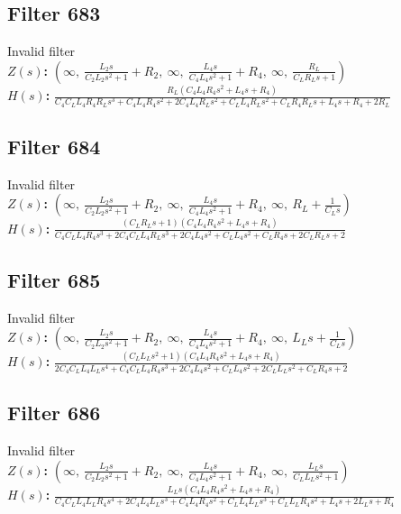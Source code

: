 \documentclass{article}
\begin{document}
\subsection*{Filter 683}
Invalid filter \\ 
\textbf{$Z(s)$:} $\left( \infty, \  \frac{L_{2} s}{C_{2} L_{2} s^{2} + 1} + R_{2}, \  \infty, \  \frac{L_{4} s}{C_{4} L_{4} s^{2} + 1} + R_{4}, \  \infty, \  \frac{R_{L}}{C_{L} R_{L} s + 1}\right)$ \\ 
\textbf{$H(s)$:} $\frac{R_{L} \left(C_{4} L_{4} R_{4} s^{2} + L_{4} s + R_{4}\right)}{C_{4} C_{L} L_{4} R_{4} R_{L} s^{3} + C_{4} L_{4} R_{4} s^{2} + 2 C_{4} L_{4} R_{L} s^{2} + C_{L} L_{4} R_{L} s^{2} + C_{L} R_{4} R_{L} s + L_{4} s + R_{4} + 2 R_{L}}$ \\ 
\subsection*{Filter 684}
Invalid filter \\ 
\textbf{$Z(s)$:} $\left( \infty, \  \frac{L_{2} s}{C_{2} L_{2} s^{2} + 1} + R_{2}, \  \infty, \  \frac{L_{4} s}{C_{4} L_{4} s^{2} + 1} + R_{4}, \  \infty, \  R_{L} + \frac{1}{C_{L} s}\right)$ \\ 
\textbf{$H(s)$:} $\frac{\left(C_{L} R_{L} s + 1\right) \left(C_{4} L_{4} R_{4} s^{2} + L_{4} s + R_{4}\right)}{C_{4} C_{L} L_{4} R_{4} s^{3} + 2 C_{4} C_{L} L_{4} R_{L} s^{3} + 2 C_{4} L_{4} s^{2} + C_{L} L_{4} s^{2} + C_{L} R_{4} s + 2 C_{L} R_{L} s + 2}$ \\ 
\subsection*{Filter 685}
Invalid filter \\ 
\textbf{$Z(s)$:} $\left( \infty, \  \frac{L_{2} s}{C_{2} L_{2} s^{2} + 1} + R_{2}, \  \infty, \  \frac{L_{4} s}{C_{4} L_{4} s^{2} + 1} + R_{4}, \  \infty, \  L_{L} s + \frac{1}{C_{L} s}\right)$ \\ 
\textbf{$H(s)$:} $\frac{\left(C_{L} L_{L} s^{2} + 1\right) \left(C_{4} L_{4} R_{4} s^{2} + L_{4} s + R_{4}\right)}{2 C_{4} C_{L} L_{4} L_{L} s^{4} + C_{4} C_{L} L_{4} R_{4} s^{3} + 2 C_{4} L_{4} s^{2} + C_{L} L_{4} s^{2} + 2 C_{L} L_{L} s^{2} + C_{L} R_{4} s + 2}$ \\ 
\subsection*{Filter 686}
Invalid filter \\ 
\textbf{$Z(s)$:} $\left( \infty, \  \frac{L_{2} s}{C_{2} L_{2} s^{2} + 1} + R_{2}, \  \infty, \  \frac{L_{4} s}{C_{4} L_{4} s^{2} + 1} + R_{4}, \  \infty, \  \frac{L_{L} s}{C_{L} L_{L} s^{2} + 1}\right)$ \\ 
\textbf{$H(s)$:} $\frac{L_{L} s \left(C_{4} L_{4} R_{4} s^{2} + L_{4} s + R_{4}\right)}{C_{4} C_{L} L_{4} L_{L} R_{4} s^{4} + 2 C_{4} L_{4} L_{L} s^{3} + C_{4} L_{4} R_{4} s^{2} + C_{L} L_{4} L_{L} s^{3} + C_{L} L_{L} R_{4} s^{2} + L_{4} s + 2 L_{L} s + R_{4}}$ \\ 
\end{document}
